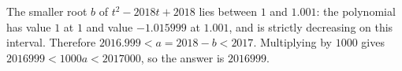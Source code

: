 The smaller root $b$ of $t^2-2018t+2018$ lies between $1$ and $1.001$: the polynomial has value $1$ at $1$ and value $-1.015999$ at $1.001$, and is strictly decreasing on this interval. Therefore $2016.999<a=2018-b<2017$. Multiplying by $1000$ gives $2016999<1000a<2017000$, so the answer is $\boxed{2016999}$.
